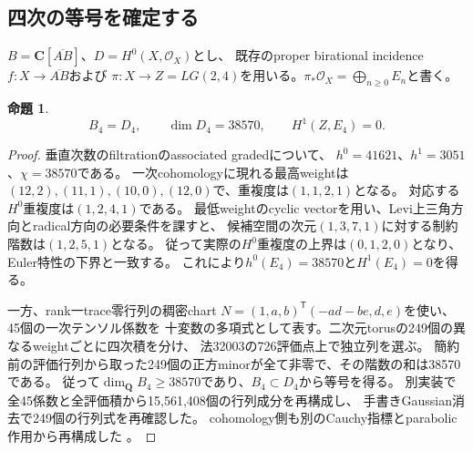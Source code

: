 \documentclass[11pt,a4paper]{ltjsarticle}
\newcommand{\CC}{\mathbf C}
\newcommand{\QQ}{\mathbf Q}
\newtheorem{proposition}[theorem]{命題}
\theoremstyle{remark}
\begin{document}
\subsection{四次の等号を確定する}
$B=\CC[\overline{AB}]$、$D=H^0(X,\mathcal O_X)$とし、
既存のproper birational incidence $f:X\to\overline{AB}$および
$\pi:X\to Z=LG(2,4)$を用いる。$\pi_*\mathcal O_X=\bigoplus_{n\ge0}E_n$と書く。
\begin{proposition}
\[
 B_4=D_4,\qquad \dim D_4=38570,\qquad H^1(Z,E_4)=0.
\]
\end{proposition}
\begin{proof}
垂直次数のfiltrationのassociated gradedについて、
$h^0=41621$、$h^1=3051$、$\chi=38570$である。
一次cohomologyに現れる最高weightは
$(12,2),(11,1),(10,0),(12,0)$で、重複度は$(1,1,2,1)$となる。
対応する$H^0$重複度は$(1,2,4,1)$である。
最低weightのcyclic vectorを用い、Levi上三角方向とradical方向の必要条件を課すと、
候補空間の次元$(1,3,7,1)$に対する制約階数は$(1,2,5,1)$となる。
従って実際の$H^0$重複度の上界は$(0,1,2,0)$となり、Euler特性の下界と一致する。
これにより$h^0(E_4)=38570$と$H^1(E_4)=0$を得る。

一方、rank一trace零行列の稠密chart
$N=(1,a,b)^{\mathsf T}(-ad-be,d,e)$を使い、45個の一次テンソル係数を
十変数の多項式として表す。二次元torusの249個の異なるweightごとに四次積を分け、
法32003の726評価点上で独立列を選ぶ。
簡約前の評価行列から取った249個の正方minorが全て非零で、その階数の和は38570である。
従って$\dim_\QQ B_4\ge38570$であり、$B_4\subset D_4$から等号を得る。
別実装で全45係数と全評価積から15,561,408個の行列成分を再構成し、
手書きGaussian消去で249個の行列式を再確認した。
cohomology側も別のCauchy指標とparabolic作用から再構成した
\cite{ab-four-v52,ab-four-minors-v52,ab-four-cohom-v52}。
\end{proof}
\end{document}
